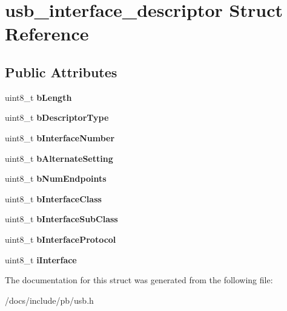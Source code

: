\hypertarget{structusb__interface__descriptor}{}\section{usb\+\_\+interface\+\_\+descriptor Struct Reference}
\label{structusb__interface__descriptor}
\subsection*{Public Attributes}
\begin{DoxyCompactItemize}
\item 
\mbox{\label{structusb__interface__descriptor_a7959ad865fb5527dba879ded533f5976}} 
uint8\+\_\+t {\bfseries b\+Length}
\item 
\mbox{\label{structusb__interface__descriptor_a757761276c9053ed877cee89cba167ea}} 
uint8\+\_\+t {\bfseries b\+Descriptor\+Type}
\item 
\mbox{\label{structusb__interface__descriptor_aea613784e25f453d059635a8d292a249}} 
uint8\+\_\+t {\bfseries b\+Interface\+Number}
\item 
\mbox{\label{structusb__interface__descriptor_aacc6f1a4e77883f97ffb0453e41c5b10}} 
uint8\+\_\+t {\bfseries b\+Alternate\+Setting}
\item 
\mbox{\label{structusb__interface__descriptor_a1fa779eda460fd7f670f7e1adeceed94}} 
uint8\+\_\+t {\bfseries b\+Num\+Endpoints}
\item 
\mbox{\label{structusb__interface__descriptor_acccd957d6f023f3d4701abd491c45cf6}} 
uint8\+\_\+t {\bfseries b\+Interface\+Class}
\item 
\mbox{\label{structusb__interface__descriptor_ac807fb07b6b89886836ad5c1253dae82}} 
uint8\+\_\+t {\bfseries b\+Interface\+Sub\+Class}
\item 
\mbox{\label{structusb__interface__descriptor_a177ebd30941b905658e1f89654d320c2}} 
uint8\+\_\+t {\bfseries b\+Interface\+Protocol}
\item 
\mbox{\label{structusb__interface__descriptor_a63008abbea76cc397836554747386055}} 
uint8\+\_\+t {\bfseries i\+Interface}
\end{DoxyCompactItemize}


The documentation for this struct was generated from the following file\+:\begin{DoxyCompactItemize}
\item 
/docs/include/pb/usb.\+h\end{DoxyCompactItemize}
